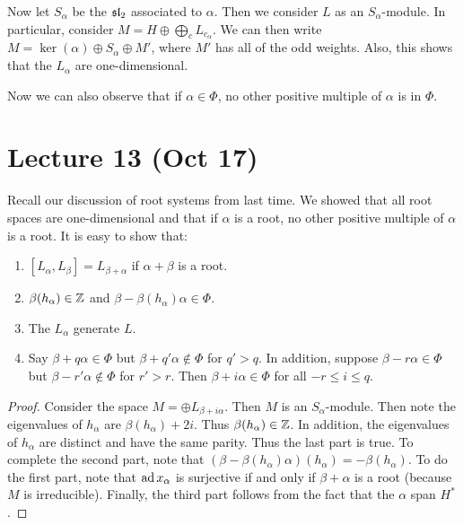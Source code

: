 \documentclass[twoside, 10pt]{article}
\begin{document}
    Now let $S_{\alpha}$ be the $\mathfrak{sl}_2$ associated to $\alpha$. Then we consider $L$ as an $S_{\alpha}$-module. In particular, consider $M = H \oplus \bigoplus_c L_{c_{\alpha}}$. We can then write $M = \ker(\alpha) \oplus S_{\alpha} \oplus M'$, where $M'$ has all of the odd weights. Also, this shows that the $L_{\alpha}$ are one-dimensional.

    Now we can also observe that if $\alpha \in \Phi$, no other positive multiple of $\alpha$ is in $\Phi$.

    \section{Lecture 13 (Oct 17)}%
    \label{sec:lecture_13_oct_17_}

    Recall our discussion of root systems from last time. We showed that all root spaces are one-dimensional and that if $\alpha$ is a root, no other positive multiple of $\alpha$ is a root. It is easy to show that:

    \begin{prop}
        \begin{enumerate}
            \item $[L_{\alpha},L_{\beta}] = L_{\beta + \alpha}$ if $\alpha + \beta$ is a root.
            \item $\beta(h_{\alpha}) \in \mathbb{Z}$ and $\beta - \beta(h_{\alpha})\alpha \in \Phi$.
            \item The $L_{\alpha}$ generate $L$.
            \item Say $\beta + q\alpha \in \Phi$ but $\beta + q'\alpha \notin \Phi$ for $q' > q$. In addition, suppose $\beta - r\alpha \in \Phi$ but $\beta - r'\alpha \notin \Phi$ for $r' > r$. Then $\beta + i \alpha \in \Phi$ for all $-r \leq i \leq q$.
        \end{enumerate}
    \end{prop}
    
    \begin{proof}
        Consider the space $M = \oplus L_{\beta + i \alpha}$. Then $M$ is an $S_{\alpha}$-module. Then note the eigenvalues of $h_{\alpha}$ are $\beta(h_{\alpha}) + 2i$. Thus $\beta(h_{\alpha}) \in \mathbb{Z}$. In addition, the eigenvalues of $h_{\alpha}$ are distinct and have the same parity. Thus the last part is true. To complete the second part, note that $(\beta - \beta(h_{\alpha})\alpha)(h_{\alpha}) = -\beta(h_{\alpha})$. To do the first part, note that $\operatorname{ad} x_{\alpha}$ is surjective if and only if $\beta + \alpha$ is a root (because $M$ is irreducible). Finally, the third part follows from the fact that the $\alpha$ span $H^*$.
    \end{proof}
\end{document}
